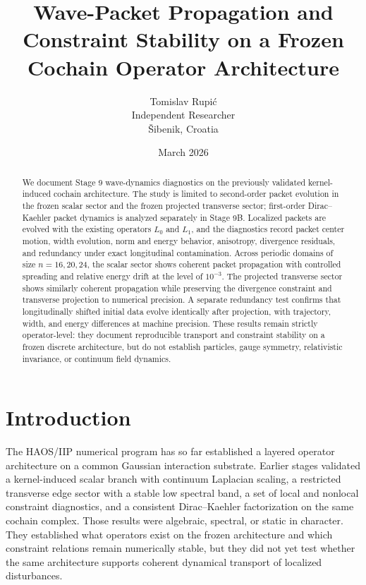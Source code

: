 \documentclass[11pt]{article}
\title{Wave-Packet Propagation and Constraint Stability on a Frozen Cochain Operator Architecture}
\author{Tomislav Rupi\'c\\Independent Researcher\\\v{S}ibenik, Croatia}
\date{March 2026}
\begin{document}
\maketitle

\begin{abstract}
We document Stage 9 wave-dynamics diagnostics on the previously validated kernel-induced cochain architecture. The study is limited to second-order packet evolution in the frozen scalar sector and the frozen projected transverse sector; first-order Dirac--Kaehler packet dynamics is analyzed separately in Stage 9B. Localized packets are evolved with the existing operators $L_0$ and $L_1$, and the diagnostics record packet center motion, width evolution, norm and energy behavior, anisotropy, divergence residuals, and redundancy under exact longitudinal contamination. Across periodic domains of size $n=16,20,24$, the scalar sector shows coherent packet propagation with controlled spreading and relative energy drift at the level of $10^{-3}$. The projected transverse sector shows similarly coherent propagation while preserving the divergence constraint and transverse projection to numerical precision. A separate redundancy test confirms that longitudinally shifted initial data evolve identically after projection, with trajectory, width, and energy differences at machine precision. These results remain strictly operator-level: they document reproducible transport and constraint stability on a frozen discrete architecture, but do not establish particles, gauge symmetry, relativistic invariance, or continuum field dynamics.
\end{abstract}

\section{Introduction}
The HAOS/IIP numerical program has so far established a layered operator architecture on a common Gaussian interaction substrate. Earlier stages validated a kernel-induced scalar branch with continuum Laplacian scaling, a restricted transverse edge sector with a stable low spectral band, a set of local and nonlocal constraint diagnostics, and a consistent Dirac--Kaehler factorization on the same cochain complex. Those results were algebraic, spectral, or static in character. They established what operators exist on the frozen architecture and which constraint relations remain numerically stable, but they did not yet test whether the same architecture supports coherent dynamical transport of localized disturbances.
\end{document}
